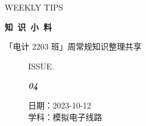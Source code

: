 \documentclass[UTF8]{ctexart}
\newcommand\Black[1]{\textcolor[gray]{0.3}{#1}}
\newcommand\Brown[1]{\textcolor[HTML]{998A4E}{#1}}
\newcommand\IssueNumber{04}
\newcommand\Date{2023-10-12}
\newcommand\Subject{模拟电子线路}
\begin{document}
\BgThispage
\begin{center}
{\scriptsize\Issue \textcolor[HTML]{C8BA83}{WEEKLY TIPS}}

{\Huge\bfseries\TitleFont \Black{知\ 识\ 小\ 料}}

\vspace{-0.1cm}
{\footnotesize \Brown{「电计 2203 班」周常规知识整理共享}}
\end{center}

\vspace{-0.5cm}

\begin{figure}[H]
\hspace{1cm}
\begin{minipage}[t]{0.3\textwidth}
\centering
    \Brown{ISSUE.}

    \vspace{-0.6cm}
    \Huge \Issue\slshape\bfseries\Black{\IssueNumber}
\end{minipage}
\hfill
\begin{minipage}[t]{0.3\textwidth}
\centering
    \Brown{日期：\Date} \\
\vspace{-0.1cm}
    \Brown{学科：\Subject} \\
\end{minipage}
\hspace{0.8cm}
\end{figure}
\end{document}
